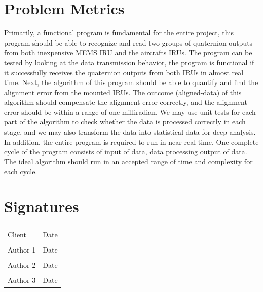 \documentclass[letterpaper,10pt,onecolumn]{IEEEtran}
\begin{document}
\section{Problem Metrics}
Primarily, a functional program is fundamental for the entire project, this program should be able to recognize and read two groups of quaternion outputs from both inexpensive MEMS IRU and the aircraft\textquotesingle s IRUs. The program can be tested by looking at the data transmission behavior, the program is functional if it successfully receives the quaternion outputs from both IRUs in almost real time. Next, the algorithm of this program should be able to quantify and find the alignment error from the mounted IRUs. The outcome (aligned-data) of this algorithm should compensate the alignment error correctly, and the alignment error should be within a range of one milliradian. We may use unit tests for each part of the algorithm to check whether the data is processed correctly in each stage, and we may also transform the data into statistical data for deep analysis. In addition, the entire program is required to run in near real time. One complete cycle of the program consists of input of data, data processing output of data. The ideal algorithm should run in an accepted range of time and complexity for each cycle. 


\newpage
\nocite{*}




\newpage
	\section{Signatures}
	\noindent\begin{tabular}{ll}
	\\[1cm]
	\makebox[2.5in]{\hrulefill} & \makebox[2.5in]{\hrulefill}\\
	Client & Date\\[8ex]%
	\makebox[2.5in]{\hrulefill} & \makebox[2.5in]{\hrulefill}\\
	Author 1 & Date\\[8ex]%
	\makebox[2.5in]{\hrulefill} & \makebox[2.5in]{\hrulefill}\\
	Author 2 & Date\\[8ex]%
	\makebox[2.5in]{\hrulefill} & \makebox[2.5in]{\hrulefill}\\
	Author 3 & Date\\[8ex]%
	\end{tabular}
\end{document}
